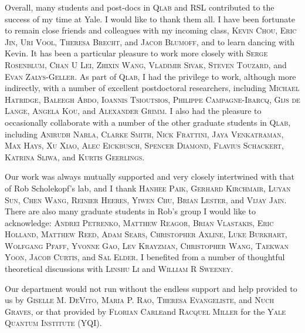 Overall, many students and post-docs in \textsc{Qlab} and \textsc{RSL} contributed to the success of my time at Yale. I would like to thank them all. I have been fortunate to remain close friends and colleagues with my incoming class, \textsc{Kevin Chou, Eric Jin, Uri Vool, Theresa Brecht}, and \textsc{Jacob Blumoff}, and to learn dancing with Kevin. It has been a particular pleasure to work more closely with \textsc{Serge Rosenblum, Chan U Lei, Zhixin Wang, Vladimir Sivak, Steven Touzard}, and \textsc{Evan Zalys-Geller}. As part of \textsc{Qlab}, I had the privilege to work, although more indirectly, with a number of excellent postdoctoral researchers, including  \textsc{Michael Hatridge, Baleegh Abdo, Ioannis Tsioutsios, Philippe Campagne-Ibarcq, Gijs de Lange, Angela Kou}, and \textsc{Alexander Grimm}. I also had the pleasure to occasionally collaborate with a number of the other graduate students in \textsc{Qlab}, including \textsc{Anirudh Narla, Clarke Smith, Nick Frattini, Jaya Venkatraman, Max Hays, Xu Xiao, Alec Eickbusch, Spencer Diamond, Flavius Schackert, Katrina Sliwa,} and \textsc{Kurtis Geerlings}.

Our work was always mutually supported and very closely intertwined with that of Rob Scholekopf’s lab, and I thank \textsc{Hanhee Paik, Gerhard Kirchmair, Luyan Sun, Chen Wang, Reinier Heeres, Yiwen Chu, Brian Lester,} and \textsc{Vijay Jain}.  There are also many graduate students in Rob’s group I would like to acknowledge: \textsc{Andrei Petrenko, Matthew Reagor, Brian Vlastakis, Eric Holland, Matthew Reed,  Adam Sears, Christopher Axline, Luke Burkhart, Wolfgang Pfaff,   Yvonne Gao, Lev Krayzman, Christopher Wang, Taekwan Yoon, Jacob Curtis}, and \textsc{Sal Elder}. I benefited from a number of thoughtful theoretical discussions with \textsc{Linshu Li} and \textsc{William R Sweeney}.  

Our department would not run without the endless support and help provided to us by \textsc{Giselle M. DeVito, Maria P. Rao, Theresa Evangeliste}, and \textsc{Nuch Graves}, or that provided by \textsc{Florian Carle}and \textsc{Racquel Miller} for the \textsc{Yale Quantum Institute (YQI)}.

